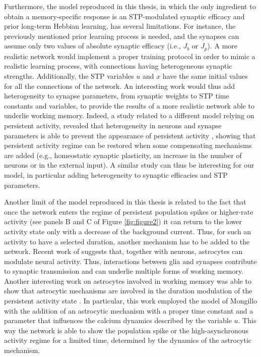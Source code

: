 \documentclass[a4paper, 12pt, twoside, openright]{book}
\begin{document}
Furthermore, the model reproduced in this thesis, in which the only ingredient to obtain a memory-specific response is an STP-modulated synaptic efficacy and prior long-term Hebbian learning, has several limitations. For instance, the previously mentioned prior learning process is needed, and the synapses can assume only two values of absolute synaptic efficacy (i.e., $J_b$ or $J_p$). A more realistic network would implement a proper training protocol in order to mimic a realistic learning process, with connections having heterogeneous synaptic strengths. Additionally, the STP variables $u$ and $x$ have the same initial values for all the connections of the network. An interesting work would thus add heterogeneity to synapse parameters, from synaptic weights to STP time constants and variables, to provide the results of a more realistic network able to underlie working memory. Indeed, a study related to a different model relying on persistent activity, revealed that heterogeneity in neurons and synapse parameters is able to prevent the appearance of persistent activity \cite{Hass2022}, showing that persistent activity regime can be restored when some compensating mechanisms are added (e.g., homeostatic synaptic plasticity, an increase in the number of neurons or in the external input). A similar study can thus be interesting for our model, in particular adding heterogeneity to synaptic efficacies and STP parameters.


Another limit of the model reproduced in this thesis is related to the fact that once the network enters the regime of persistent population spikes or higher-rate activity (see panels B and C of Figure \ref{fig:figure2}) it can return to the lower activity state only with a decrease of the background current. Thus, for such an activity to have a selected duration, another mechanism has to be added to the network. Recent work of \cite{DePitta2022} suggests that, together with neurons, astrocytes can modulate neural activity. Thus, interactions between glia and synapses contribute to synaptic transmission and can underlie multiple forms of working memory. Another interesting work on astrocytes involved in working memory was able to show that astrocytic mechanisms are involved in the duration modulation of the persistent activity state \cite{Becker2022}. In particular, this work employed the model of Mongillo \cite{Mongillo2008} with the addition of an astrocytic mechanism with a proper time constant and a parameter that influences the calcium dynamics described by the variable $u$. This way the network is able to show the population spike or the high-asynchronous activity regime for a limited time, determined by the dynamics of the astrocytic mechanism. 
\end{document}
